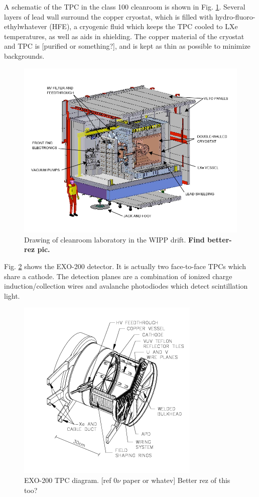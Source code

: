 A schematic of the TPC in the class 100 cleanroom is shown in Fig. \ref{fig:cleanroom}.  Several layers of lead wall surround the copper cryostat, which is filled with hydro-fluoro-ethylwhatever (HFE), a cryogenic fluid which keeps the TPC cooled to LXe temperatures, as well as aids in shielding.  The copper material of the cryostat and TPC is [purified or something?], and is kept as thin as possible to minimize backgrounds.

\begin{figure}[H]
	\centering
	\includegraphics[width=.7\textwidth]{figures/cleanroom.png}
	\caption{Drawing of cleanroom laboratory in the WIPP drift.  \textbf{\color{red} Find better-rez pic.}}
\label{fig:cleanroom}
\end{figure}

Fig. \ref{fig:tpc} shows the EXO-200 detector.  It is actually two face-to-face TPCs which share a cathode.  The detection planes are a combination of ionized charge induction/collection wires and avalanche photodiodes which detect scintillation light.

\begin{figure}[H]
	\centering
	\includegraphics[width=.7\textwidth]{figures/TPC.png}
	\caption{EXO-200 TPC diagram.  [ref $0\nu$ paper or whatev]  {\color{red}Better rez of this too?}}
\label{fig:tpc}
\end{figure}

